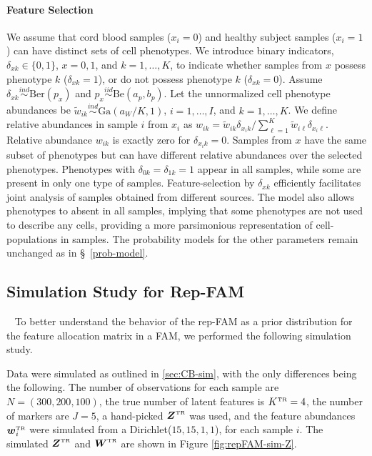 \documentclass[12pt,]{article}
\newcommand{\iid}{\overset{iid}{\sim}}
\newcommand{\ind}{\overset{ind}{\sim}}
\def\G{\text{Ga}}
\def\Ber{\text{Ber}}
\def\Be{\text{Be}}
\newcommand{\true}{{\mbox{\tiny TR}}}
\newcommand{\bZ}{\mbox{\boldmath $Z$}}
\newcommand{\bw}{\mbox{\boldmath $w$}}
\newcommand{\bW}{\mbox{\boldmath $W$}}
\begin{document}
\paragraph*{Feature Selection} We assume that cord blood samples ($x_i=0$) and
healthy subject samples ($x_i=1$) can have distinct sets of cell phenotypes.
We introduce binary indicators, $\delta_{xk}\in \{0, 1\}$, $x=0,1$, and
$k=1,\ldots, K$, to indicate whether samples from $x$ possess phenotype $k$
($\delta_{xk}=1$), or do not possess phenotype $k$ ($\delta_{xk}=0$). Assume
$\delta_{xk} \ind \Ber(p_{x})$ and $p_x \iid \Be(a_p, b_p)$.  Let the unnormalized
cell phenotype abundances be $\tilde w_{ik} \ind \G(a_W/K, 1)$, $i=1, \ldots, I$,
and $k=1, \ldots, K$. We define relative abundances in sample $i$ from
$x_i$ as 
$
w_{ik} =\tilde w_{ik} \delta_{x_i k}/\sum_{\ell=1}^K\tilde w_{i\ell} \delta_{x_i \ell}.
$
Relative abundance $w_{ik}$ is exactly zero for $\delta_{x_ik}=0$. Samples
from $x$ have the same subset of phenotypes but can have different relative
abundances over the selected phenotypes. Phenotypes with
$\delta_{0k}=\delta_{1k}=1$ appear in all samples, while some are present in only
one type of samples. Feature-selection by $\delta_{xk}$ efficiently facilitates
joint analysis of samples obtained from different sources. The model also
allows phenotypes to absent in all samples, implying that some phenotypes are not
used to describe any cells, providing a more parsimonious representation of 
cell-populations in samples. The probability models for the other parameters
remain unchanged as in \S~\ref{prob-model}.  



\subsection{Simulation Study for Rep-FAM}~\label{sec:rep-sim}
To better understand the behavior of the rep-FAM as a prior distribution for
the feature allocation matrix in a FAM, we performed the following simulation
study.

Data were simulated as outlined in \ref{sec:CB-sim}, with the only differences 
being the following. The number of observations for each sample are 
$N=(300, 200, 100)$, the true number of latent features is $K^\true=4$, 
the number of markers are $J=5$, a hand-picked $\bZ^\true$ was used, and the
feature abundances $\bw_i^\true$ were simulated from a Dirichlet($15, 15, 1,
1$), for each sample $i$.  The simulated $\bZ^\true$ and $\bW^\true$
are shown in Figure \ref{fig:repFAM-sim-Z}.
\end{document}
